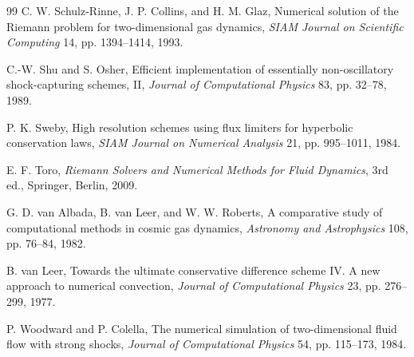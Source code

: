 \documentclass[11pt]{article}
\theoremstyle{plain}
\theoremstyle{definition}
\begin{document}
\begin{thebibliography}{99}
 C. W. Schulz-Rinne, J. P. Collins, and H. M. Glaz, Numerical solution of the Riemann problem for two-dimensional gas dynamics, \textit{SIAM Journal on Scientific Computing} 14, pp. 1394--1414, 1993.

 C.-W. Shu and S. Osher, Efficient implementation of essentially non-oscillatory shock-capturing schemes, II, \textit{Journal of Computational Physics} 83, pp. 32--78, 1989.

 P. K. Sweby, High resolution schemes using flux limiters for hyperbolic conservation laws, \textit{SIAM Journal on Numerical Analysis} 21, pp. 995--1011, 1984.

 E. F. Toro, \textit{Riemann Solvers and Numerical Methods for Fluid Dynamics}, 3rd ed., Springer, Berlin, 2009.

 G. D. van Albada, B. van Leer, and W. W. Roberts, A comparative study of computational methods in cosmic gas dynamics, \textit{Astronomy and Astrophysics} 108, pp. 76--84, 1982.

 B. van Leer, Towards the ultimate conservative difference scheme IV. A new approach to numerical convection, \textit{Journal of Computational Physics} 23, pp. 276--299, 1977.

 P. Woodward and P. Colella, The numerical simulation of two-dimensional fluid flow with strong shocks, \textit{Journal of Computational Physics} 54, pp. 115--173, 1984.

\end{thebibliography}
\end{document}

